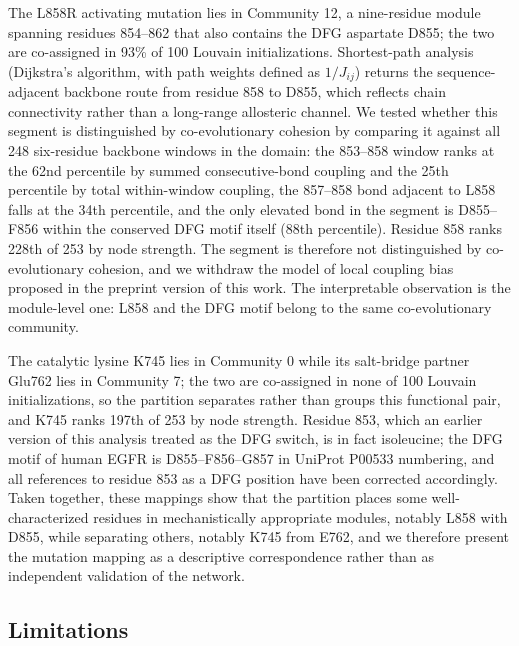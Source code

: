 \documentclass[utf8]{FrontiersinHarvard}
\begin{document}
The L858R activating mutation lies in Community 12, a nine-residue module spanning residues 854--862 that also contains the DFG aspartate D855; the two are co-assigned in 93\% of 100 Louvain initializations. Shortest-path analysis (Dijkstra's algorithm, with path weights defined as $1/J_{ij}$) returns the sequence-adjacent backbone route from residue 858 to D855, which reflects chain connectivity rather than a long-range allosteric channel. We tested whether this segment is distinguished by co-evolutionary cohesion by comparing it against all 248 six-residue backbone windows in the domain: the 853--858 window ranks at the 62nd percentile by summed consecutive-bond coupling and the 25th percentile by total within-window coupling, the 857--858 bond adjacent to L858 falls at the 34th percentile, and the only elevated bond in the segment is D855--F856 within the conserved DFG motif itself (88th percentile). Residue 858 ranks 228th of 253 by node strength. The segment is therefore not distinguished by co-evolutionary cohesion, and we withdraw the model of local coupling bias proposed in the preprint version of this work. The interpretable observation is the module-level one: L858 and the DFG motif belong to the same co-evolutionary community.

The catalytic lysine K745 lies in Community 0 while its salt-bridge partner Glu762 lies in Community 7; the two are co-assigned in none of 100 Louvain initializations, so the partition separates rather than groups this functional pair, and K745 ranks 197th of 253 by node strength. Residue 853, which an earlier version of this analysis treated as the DFG switch, is in fact isoleucine; the DFG motif of human EGFR is D855--F856--G857 in UniProt P00533 numbering, and all references to residue 853 as a DFG position have been corrected accordingly. Taken together, these mappings show that the partition places some well-characterized residues in mechanistically appropriate modules, notably L858 with D855, while separating others, notably K745 from E762, and we therefore present the mutation mapping as a descriptive correspondence rather than as independent validation of the network.

\subsection{Limitations}
\label{sec:limitations}
\end{document}
